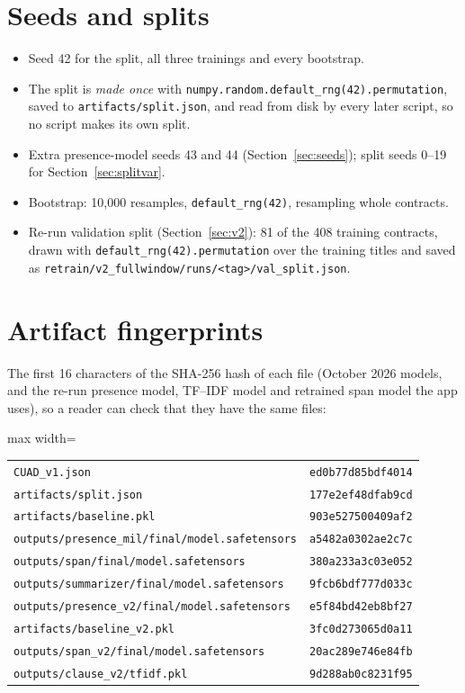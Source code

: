 \section*{Seeds and splits}
\begin{itemize}[itemsep=2pt]
  \item Seed 42 for the split, all three trainings and every bootstrap.
  \item The split is \emph{made once} with \texttt{numpy.random.default\_rng(42).permutation}, saved to \texttt{artifacts/split.json}, and read from disk by every later script, so no script makes its own split.
  \item Extra presence-model seeds 43 and 44 (Section~\ref{sec:seeds}); split seeds 0--19 for Section~\ref{sec:splitvar}.
  \item Bootstrap: 10{,}000 resamples, \texttt{default\_rng(42)}, resampling whole contracts.
  \item Re-run validation split (Section~\ref{sec:v2}): 81 of the 408 training contracts, drawn with \texttt{default\_rng(42).permutation} over the training titles and saved as \texttt{retrain/v2\_fullwindow/runs/<tag>/val\_split.json}.
\end{itemize}

\section*{Artifact fingerprints}
The first 16 characters of the SHA-256 hash of each file (October 2026 models, and the re-run presence model, TF--IDF model and retrained span model the app uses), so a reader can check that they have the same files:

\begin{adjustbox}{max width=\textwidth}
\begin{tabular}{ll}
\toprule
\texttt{CUAD\_v1.json} & \texttt{ed0b77d85bdf4014}\\
\texttt{artifacts/split.json} & \texttt{177e2ef48dfab9cd}\\
\texttt{artifacts/baseline.pkl} & \texttt{903e527500409af2}\\
\texttt{outputs/presence\_mil/final/model.safetensors} & \texttt{a5482a0302ae2c7c}\\
\texttt{outputs/span/final/model.safetensors} & \texttt{380a233a3c03e052}\\
\texttt{outputs/summarizer/final/model.safetensors} & \texttt{9fcb6bdf777d033c}\\
\texttt{outputs/presence\_v2/final/model.safetensors} & \texttt{e5f84bd42eb8bf27}\\
\texttt{artifacts/baseline\_v2.pkl} & \texttt{3fc0d273065d0a11}\\
\texttt{outputs/span\_v2/final/model.safetensors} & \texttt{20ac289e746e84fb}\\
\texttt{outputs/clause\_v2/tfidf.pkl} & \texttt{9d288ab0c8231f95}\\
\bottomrule
\end{tabular}
\end{adjustbox}

